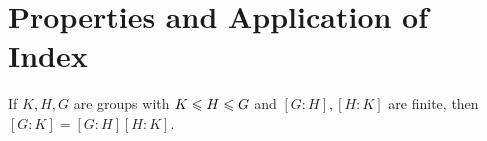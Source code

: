 \chapter{Properties and Application of Index}\label{chp:1_5}

\begin{proposition}{}{}
    If $K, H, G$ are groups with $K \leqslant H \leqslant G$ and $[G:H],[H:K]$ are finite,
    then $[G : K] = [G :H][H : K]$. 
\end{proposition}
